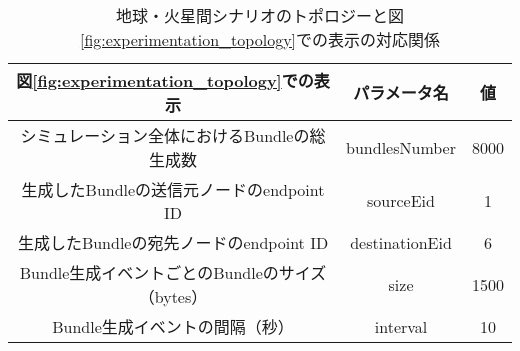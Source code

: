 \begin{table}[htbp]
    \centering
    \caption{地球・火星間シナリオのトポロジーと図\ref{fig:experimentation_topology}での表示の対応関係}
    \vspace{3mm}
    \begin{tabular}{ccc}  \hline
        図\ref{fig:experimentation_topology}での表示 & パラメータ名 & 値 \\ \hline
        シミュレーション全体におけるBundleの総生成数 & bundlesNumber & 8000 \\
        生成したBundleの送信元ノードのendpoint ID & sourceEid & 1 \\
        生成したBundleの宛先ノードのendpoint ID & destinationEid & 6 \\
        Bundle生成イベントごとのBundleのサイズ（bytes）& size & 1500\\
        Bundle生成イベントの間隔（秒）& interval & 10 \\ \hline
    \end{tabular}
    \label{table:traffic_earth_mars}
\end{table}
